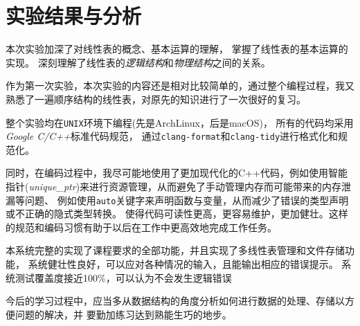 \section{实验结果与分析}\label{sec:4}
本次实验加深了对线性表的概念、基本运算的理解，
掌握了线性表的基本运算的实现。
深刻理解了线性表的\emph{逻辑结构}和\emph{物理结构}之间的关系。
\par
作为第一次实验，本次实验的内容还是相对比较简单的，通过整个编程过程，我又熟悉了一遍顺序结构的线性表，对原先的知识进行了一次很好的复习。
\par 整个实验均在\texttt{UNIX}环境下编程(先是ArchLinux，后是macOS)，
所有的代码均采用\emph{Google C/C++}标准代码规范，
通过\texttt{clang-format}和\texttt{clang-tidy}进行格式化和规范化。
\par
同时，在编码过程中，我尽可能地使用了更加现代化的C++代码，例如使用智能指针(\textit{unique\_ptr})来进行资源管理，从而避免了手动管理内存而可能带来的内存泄漏等问题、
例如使用\texttt{auto}关键字来声明函数与变量，从而减少了错误的类型声明或不正确的隐式类型转换。
使得代码可读性更高，更容易维护，更加健壮。这样的规范和编码习惯有助于以后在工作中更高效地完成工作任务。
\par
本系统完整的实现了课程要求的全部功能，并且实现了多线性表管理和文件存储功能，
系统健壮性良好，可以应对各种情况的输入，且能输出相应的错误提示。
系统测试覆盖度接近100\%，可以认为不会发生逻辑错误
\par
今后的学习过程中，应当多从数据结构的角度分析如何进行数据的处理、存储以方便问题的解决，并 要勤加练习达到熟能生巧的地步。

